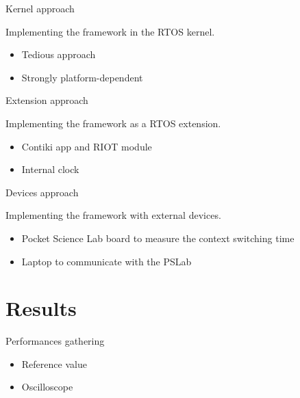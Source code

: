 \documentclass{beamer}
\begin{document}
\begin{frame}{Kernel approach}

Implementing the framework in the RTOS kernel.

\begin{itemize}
\tightlist
\item
  Tedious approach
\item
  Strongly platform-dependent
\end{itemize}

\end{frame}


\begin{frame}{Extension approach}

Implementing the framework as a RTOS extension.

\begin{itemize}
\tightlist
\item
  Contiki app and RIOT module
\item
  Internal clock
\end{itemize}

\end{frame}


\begin{frame}{Devices approach}

Implementing the framework with external devices.

\begin{itemize}
\tightlist
\item
  Pocket Science Lab board to measure the context switching time
\item
  Laptop to communicate with the PSLab
\end{itemize}

\end{frame}


\hypertarget{results}{%
\section{Results}\label{results}}


\begin{frame}{Performances gathering}
\protect\hypertarget{performances-gathering}{}

\begin{itemize}
\tightlist
\item
  Reference value
\item
  Oscilloscope
\end{itemize}

\end{frame}
\end{document}
